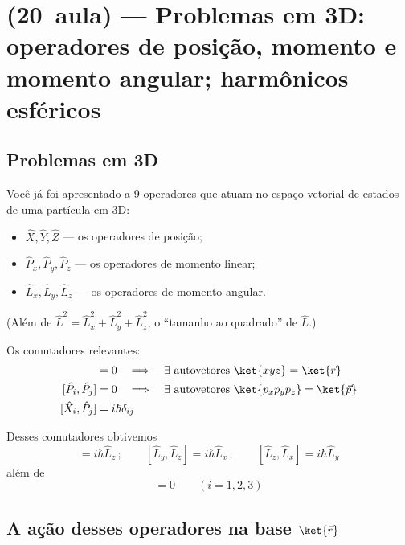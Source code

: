 \section*{(20\textordfeminine\ aula) --- Problemas em 3D: operadores de posição, momento e momento angular; harmônicos esféricos}

\subsection*{Problemas em 3D}

Você já foi apresentado a 9 operadores que atuam no espaço vetorial de estados de uma partícula em 3D:

\begin{itemize}
    \item $\hat{X}, \hat{Y}, \hat{Z}$ --- os operadores de posição;
    \item $\hat{P}_x, \hat{P}_y, \hat{P}_z$ --- os operadores de momento linear;
    \item $\hat{L}_x, \hat{L}_y, \hat{L}_z$ --- os operadores de momento angular.
\end{itemize}

(Além de $\hat{L}^2 = \hat{L}_x^2 + \hat{L}_y^2 + \hat{L}_z^2$, o ``tamanho ao quadrado'' de $\hat{L}$.)

Os comutadores relevantes:
\begin{align}
    [\hat{X}_i, \hat{X}_j] &= 0 \quad \Longrightarrow \quad \exists \text{ autovetores } \ket{xyz} = \ket{\vec{r}} \label{eq:aula20_comm_XX} \\
    [\hat{P}_i, \hat{P}_j] &= 0 \quad \Longrightarrow \quad \exists \text{ autovetores } \ket{p_x p_y p_z} = \ket{\vec{p}} \label{eq:aula20_comm_PP} \\
    [\hat{X}_i, \hat{P}_j] &= i\hbar \delta_{ij} \label{eq:aula20_comm_XP}
\end{align}

Desses comutadores obtivemos
\begin{equation}
    [\hat{L}_x, \hat{L}_y] = i\hbar \hat{L}_z \, ; \qquad [\hat{L}_y, \hat{L}_z] = i\hbar \hat{L}_x \, ; \qquad [\hat{L}_z, \hat{L}_x] = i\hbar \hat{L}_y
\label{eq:aula20_comm_L}
\end{equation}
além de
\begin{equation}
    [\hat{L}^2, \hat{L}_i] = 0 \qquad (i = 1, 2, 3)
\label{eq:aula20_comm_L2Li}
\end{equation}

\subsection*{A ação desses operadores na base $\ket{\vec{r}}$}

